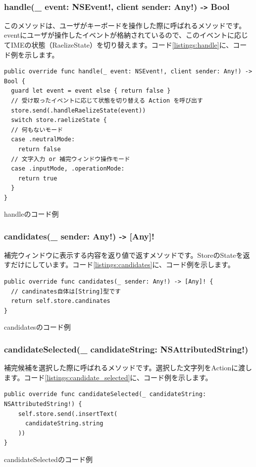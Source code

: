 \documentclass[uplatex,a4j,12pt,twocolumn]{jsarticle}
\begin{document}
\subsubsection{handle(\_ event: NSEvent!, client sender: Any!) -\texttt{>} Bool}
このメソッドは、ユーザがキーボードを操作した際に呼ばれるメソッドです。eventにユーザが操作したイベントが格納されているので、このイベントに応じてIMEの状態（RaelizeState）を切り替えます。コード\ref{listings:handle}に、コード例を示します。
\begin{listing}[h]
  \begin{verbatim}
public override func handle(_ event: NSEvent!, client sender: Any!) -> Bool {
  guard let event = event else { return false }
  // 受け取ったイベントに応じて状態を切り替える Action を呼び出す
  store.send(.handleRaelizeState(event))
  switch store.raelizeState {
  // 何もないモード
  case .neutralMode:
    return false
  // 文字入力 or 補完ウィンドウ操作モード  
  case .inputMode, .operationMode:
    return true
  }
}
  \end{verbatim}
  \caption{handleのコード例}\label{listings:handle}
\end{listing}

\subsubsection{candidates(\_ sender: Any!) -\texttt{>} [Any]!}
補完ウィンドウに表示する内容を返り値で返すメソッドです。StoreのStateを返すだけにしています。コード\ref{listings:candidates}に、コード例を示します。
\begin{listing}[h]
  \begin{verbatim}
public override func candidates(_ sender: Any!) -> [Any]! {
  // candinates自体は[String]型です
  return self.store.candinates
}
  \end{verbatim}
  \caption{candidatesのコード例}\label{listings:candidates}
\end{listing}

\subsubsection{candidateSelected(\_ candidateString: NSAttributedString!)}
補完候補を選択した際に呼ばれるメソッドです。選択した文字列をActionに渡します。コード\ref{listings:candidate_selected}に、コード例を示します。
\begin{listing}[h]
  \begin{verbatim}
public override func candidateSelected(_ candidateString: NSAttributedString!) {
    self.store.send(.insertText(
      candidateString.string
    ))
}
  \end{verbatim}
  \caption{candidateSelectedのコード例}\label{listings:candidate_selected}
\end{listing}
\end{document}
